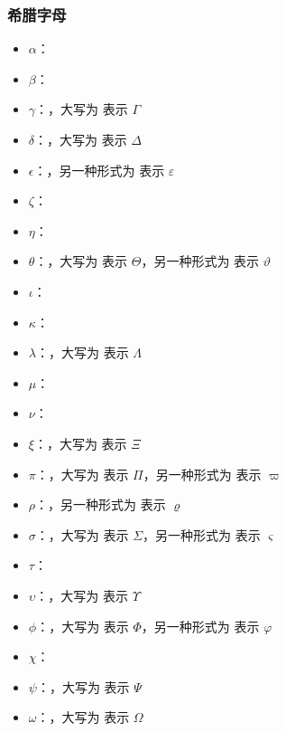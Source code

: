 \documentclass{article}
\begin{document}
\subsubsection{希腊字母}
\begin{itemize}
    \item \(\alpha\)：\texttt{\alpha}
    \item \(\beta\)：\texttt{\beta}
    \item \(\gamma\)：\texttt{\gamma}，大写为 \texttt{\Gamma} 表示 \(\Gamma\)
    \item \(\delta\)：\texttt{\delta}，大写为 \texttt{\Delta} 表示 \(\Delta\)
    \item \(\epsilon\)：\texttt{\epsilon}，另一种形式为 \texttt{\varepsilon} 表示 \(\varepsilon\)
    \item \(\zeta\)：\texttt{\zeta}
    \item \(\eta\)：\texttt{\eta}
    \item \(\theta\)：\texttt{\theta}，大写为 \texttt{\Theta} 表示 \(\Theta\)，另一种形式为 \texttt{\vartheta} 表示 \(\vartheta\)
    \item \(\iota\)：\texttt{\iota}
    \item \(\kappa\)：\texttt{\kappa}
    \item \(\lambda\)：\texttt{\lambda}，大写为 \texttt{\Lambda} 表示 \(\Lambda\)
    \item \(\mu\)：\texttt{\mu}
    \item \(\nu\)：\texttt{\nu}
    \item \(\xi\)：\texttt{\xi}，大写为 \texttt{\Xi} 表示 \(\Xi\)
    \item \(\pi\)：\texttt{\pi}，大写为 \texttt{\Pi} 表示 \(\Pi\)，另一种形式为 \texttt{\varpi} 表示 \(\varpi\)
    \item \(\rho\)：\texttt{\rho}，另一种形式为 \texttt{\varrho} 表示 \(\varrho\)
    \item \(\sigma\)：\texttt{\sigma}，大写为 \texttt{\Sigma} 表示 \(\Sigma\)，另一种形式为 \texttt{\varsigma} 表示 \(\varsigma\)
    \item \(\tau\)：\texttt{\tau}
    \item \(\upsilon\)：\texttt{\upsilon}，大写为 \texttt{\Upsilon} 表示 \(\Upsilon\)
    \item \(\phi\)：\texttt{\phi}，大写为 \texttt{\Phi} 表示 \(\Phi\)，另一种形式为 \texttt{\varphi} 表示 \(\varphi\)
    \item \(\chi\)：\texttt{\chi}
    \item \(\psi\)：\texttt{\psi}，大写为 \texttt{\Psi} 表示 \(\Psi\)
    \item \(\omega\)：\texttt{\omega}，大写为 \texttt{\Omega} 表示 \(\Omega\)
\end{itemize}
\end{document}
